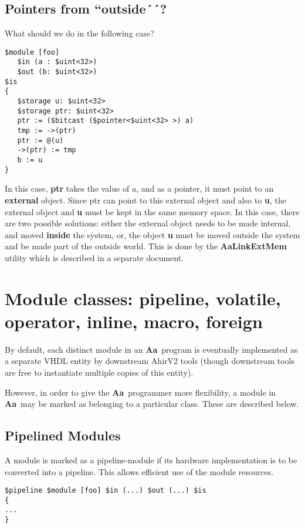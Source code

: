 \documentclass{article}
\newcommand{\Aa}{{\bf Aa}~}
\begin{document}
\subsection{Pointers from ``outside´´? }

What should we do in the following case?
\begin{verbatim}
$module [foo]
   $in (a : $uint<32>)
   $out (b: $uint<32>)
$is
{
   $storage u: $uint<32> 
   $storage ptr: $uint<32>
   ptr := ($bitcast ($pointer<$uint<32> >) a)
   tmp := ->(ptr)
   ptr := @(u)
   ->(ptr) := tmp
   b := u
}
\end{verbatim}
In this case, {\bf ptr} takes the value of $a$,
and as a pointer, it must point to 
an {\bf external} object.  Since ptr can 
point to this external object and also to {\bf u},
the external object and {\bf u} must be kept in
the same memory space.  In this case, there
are two possible solutions: either the external
object needs
to be made internal, and moved {\bf inside} the system,
or, the object {\bf u} must be moved outside the system
and be made part of the outside world.
This is done by the {\bf AaLinkExtMem} utility
which is described in a separate document.


\section{Module classes: pipeline, volatile, operator, inline, macro, foreign }

By default, each distinct module in an \Aa program
is eventually implemented as a separate VHDL entity
by downstream AhirV2 tools (though downstream
tools are free to instantiate multiple
copies of this entity).  

However, in order to give the \Aa programmer
more flexibility,  a module in \Aa may be marked
as belonging to a particular class.  These
are described below.

\subsection{Pipelined Modules}

A module is marked as a pipeline-module if its
hardware implementation is to be converted into 
a pipeline.  This allows efficient use of the module
resources.

\begin{verbatim}
$pipeline $module [foo] $in (...) $out (...) $is
{
...
}
\end{verbatim}
\end{document}
